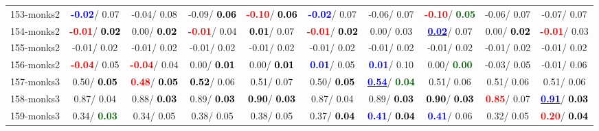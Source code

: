 \begin{table}[h]
\begin{center}
{\begin{tabular}{lc|c|c|c|c|c|c|c|c}
153-monks2 & \textcolor{blue}{\textbf{ -0.02}}/  0.07 &  -0.04/  0.08 &  -0.09/\textcolor{black}{\textbf{  0.06}} & \textcolor{red}{\textbf{ -0.10}}/\textcolor{black}{\textbf{  0.06}} & \textcolor{blue}{\textbf{ -0.02}}/  0.07 &  -0.06/  0.07 & \textcolor{red}{\textbf{ -0.10}}/\textcolor{darkgreen}{\textbf{  0.05}} &  -0.06/  0.07 &  -0.07/  0.07 \\
154-monks2 & \textcolor{red}{\textbf{ -0.01}}/\textcolor{black}{\textbf{  0.02}} &   0.00/\textcolor{black}{\textbf{  0.02}} & \textcolor{red}{\textbf{ -0.01}}/  0.04 & \textcolor{black}{\textbf{  0.01}}/  0.07 & \textcolor{red}{\textbf{ -0.01}}/\textcolor{black}{\textbf{  0.02}} &   0.00/  0.03 & \underline{\textcolor{blue}{\textbf{  0.02}}}/  0.07 &   0.00/\textcolor{black}{\textbf{  0.02}} & \textcolor{red}{\textbf{ -0.01}}/  0.03 \\
155-monks2 &  -0.01/  0.02 &  -0.01/  0.02 &  -0.01/  0.02 &  -0.01/  0.02 &  -0.01/  0.02 &  -0.01/  0.02 &  -0.01/  0.02 &  -0.01/  0.02 &  -0.01/  0.02 \\
156-monks2 & \textcolor{red}{\textbf{ -0.04}}/  0.05 & \textcolor{red}{\textbf{ -0.04}}/  0.04 &   0.00/\textcolor{black}{\textbf{  0.01}} &   0.00/\textcolor{black}{\textbf{  0.01}} & \textcolor{blue}{\textbf{  0.01}}/  0.05 & \textcolor{blue}{\textbf{  0.01}}/  0.10 &   0.00/\textcolor{darkgreen}{\textbf{  0.00}} &  -0.03/  0.05 &  -0.01/  0.06 \\ \hline
157-monks3 &   0.50/\textcolor{black}{\textbf{  0.05}} & \textcolor{red}{\textbf{  0.48}}/\textcolor{black}{\textbf{  0.05}} & \textcolor{black}{\textbf{  0.52}}/  0.06 &   0.51/  0.07 &   0.50/\textcolor{black}{\textbf{  0.05}} & \underline{\textcolor{blue}{\textbf{  0.54}}}/\textcolor{darkgreen}{\textbf{  0.04}} &   0.51/  0.06 &   0.51/  0.06 &   0.51/  0.06 \\
158-monks3 &   0.87/  0.04 &   0.88/\textcolor{black}{\textbf{  0.03}} &   0.89/\textcolor{black}{\textbf{  0.03}} & \textcolor{black}{\textbf{  0.90}}/\textcolor{black}{\textbf{  0.03}} &   0.87/  0.04 &   0.89/\textcolor{black}{\textbf{  0.03}} & \textcolor{black}{\textbf{  0.90}}/\textcolor{black}{\textbf{  0.03}} & \textcolor{red}{\textbf{  0.85}}/  0.07 & \underline{\textcolor{blue}{\textbf{  0.91}}}/\textcolor{black}{\textbf{  0.03}} \\
159-monks3 &   0.34/\textcolor{darkgreen}{\textbf{  0.03}} &   0.34/  0.05 &   0.38/  0.05 &   0.38/  0.05 &   0.37/\textcolor{black}{\textbf{  0.04}} & \textcolor{blue}{\textbf{  0.41}}/\textcolor{black}{\textbf{  0.04}} & \textcolor{blue}{\textbf{  0.41}}/  0.06 &   0.32/  0.05 & \textcolor{red}{\textbf{  0.20}}/\textcolor{black}{\textbf{  0.04}} \\

\end{tabular}}
\end{center}
\end{table}
